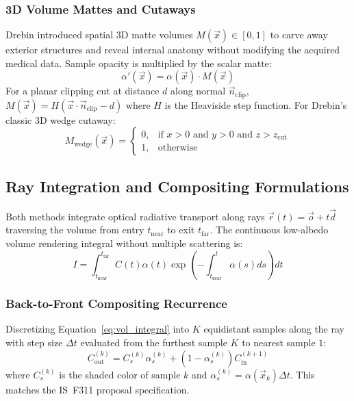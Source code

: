 \documentclass[10pt,twocolumn,a4paper]{article}
\begin{document}
\subsubsection{3D Volume Mattes and Cutaways}
Drebin introduced spatial 3D matte volumes $M(\vec{x}) \in [0, 1]$ to carve away exterior structures and reveal internal anatomy without modifying the acquired medical data. Sample opacity is multiplied by the scalar matte:
\begin{equation}
\alpha'(\vec{x}) = \alpha(\vec{x}) \cdot M(\vec{x})
\end{equation}
For a planar clipping cut at distance $d$ along normal $\vec{n}_{\text{clip}}$, $M(\vec{x}) = H(\vec{x} \cdot \vec{n}_{\text{clip}} - d)$ where $H$ is the Heaviside step function. For Drebin's classic 3D wedge cutaway:
\begin{equation}
M_{\text{wedge}}(\vec{x}) = \begin{cases}
0, & \text{if } x > 0 \text{ and } y > 0 \text{ and } z > z_{\text{cut}} \\
1, & \text{otherwise}
\end{cases}
\end{equation}

\subsection{Ray Integration and Compositing Formulations}
Both methods integrate optical radiative transport along rays $\vec{r}(t) = \vec{o} + t \vec{d}$ traversing the volume from entry $t_{\text{near}}$ to exit $t_{\text{far}}$. The continuous low-albedo volume rendering integral without multiple scattering is:
\begin{equation}
I = \int_{t_{\text{near}}}^{t_{\text{far}}} C(t) \alpha(t) \exp\left(-\int_{t_{\text{near}}}^{t} \alpha(s) ds \right) dt
\label{eq:vol_integral}
\end{equation}

\subsubsection{Back-to-Front Compositing Recurrence}
Discretizing Equation~\eqref{eq:vol_integral} into $K$ equidistant samples along the ray with step size $\Delta t$ evaluated from the furthest sample $K$ to nearest sample $1$:
\begin{equation}
C_{\text{out}}^{(k)} = C_s^{(k)} \alpha_s^{(k)} + (1 - \alpha_s^{(k)}) C_{\text{in}}^{(k+1)}
\label{eq:b2f}
\end{equation}
where $C_s^{(k)}$ is the shaded color of sample $k$ and $\alpha_s^{(k)} = \alpha(\vec{x}_k) \Delta t$. This matches the IS~F311 proposal specification.
\end{document}
